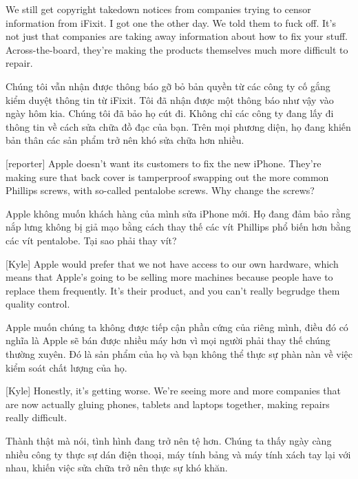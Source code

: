 \documentclass[a4paper]{article}
\begin{document}
	We still get copyright takedown notices from companies trying to censor information from iFixit.
	I got one the other day.
	We told them to fuck off.
	It's not just that companies are taking away information about how to fix your stuff.
	Across-the-board, they're making the products themselves much more difficult to repair.
	
	\begin{vietnamese-v2}
		Chúng tôi vẫn nhận được thông báo gỡ bỏ bản quyền từ các công ty cố gắng kiểm duyệt thông tin từ iFixit.
		Tôi đã nhận được một thông báo như vậy vào ngày hôm kia.
		Chúng tôi đã bảo họ cút đi.
		Không chỉ các công ty đang lấy đi thông tin về cách sửa chữa đồ đạc của bạn.
		Trên mọi phương diện, họ đang khiến bản thân các sản phẩm trở nên khó sửa chữa hơn nhiều.
	\end{vietnamese-v2}
	
	[reporter] Apple doesn't want its customers to fix the new iPhone.
	They're making sure that back cover is tamperproof swapping out the more common Phillips screws, with so-called pentalobe screws.
	Why change the screws?
	
	\begin{vietnamese-v2}
		 Apple không muốn khách hàng của mình sửa iPhone mới.
		Họ đang đảm bảo rằng nắp lưng không bị giả mạo bằng cách thay thế các vít Phillips phổ biến hơn bằng các vít pentalobe.
		Tại sao phải thay vít?
	\end{vietnamese-v2}
	
	[Kyle] Apple would prefer that we not have access to our own hardware, which means that Apple's going to be selling more machines because people have to replace them frequently. It's their product, and you can't really begrudge them quality control.
	
	\begin{vietnamese-v2}
		[Kyle] Apple muốn chúng ta không được tiếp cận phần cứng của riêng mình, điều đó có nghĩa là Apple sẽ bán được nhiều máy hơn vì mọi người phải thay thế chúng thường xuyên. Đó là sản phẩm của họ và bạn không thể thực sự phàn nàn về việc kiểm soát chất lượng của họ.
	\end{vietnamese-v2}
	
	[Kyle] Honestly, it's getting worse. We're seeing more and more companies that are now actually gluing phones, tablets and laptops together, making repairs really difficult.
	
	\begin{vietnamese-v2}
		[Kyle] Thành thật mà nói, tình hình đang trở nên tệ hơn. Chúng ta thấy ngày càng nhiều công ty thực sự dán điện thoại, máy tính bảng và máy tính xách tay lại với nhau, khiến việc sửa chữa trở nên thực sự khó khăn.
	\end{vietnamese-v2}
	
\end{document}
